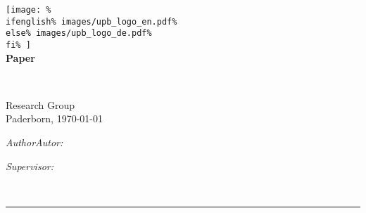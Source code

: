 \begin{center}
    \texttt{[image: \%
        \\ifenglish\%
        images/upb\_logo\_en.pdf\%
        \\else\%
        images/upb\_logo\_de.pdf\%
        \\fi\%
    ]}\\[0.4cm]
    
    
    \textbf{\Large \type{} Paper}\\[0.5cm]
    \begin{minipage}{\textwidth}
        \centering\huge\bfseries \makeatletter\textsf{\@title}\makeatother
    \end{minipage}\\[0.5cm]



    {Research Group \ResearchGroup}\\
    {Paderborn, \today}\\[0.5cm]

    \begin{minipage}{0.45\textwidth}
        \emph{\ifenglish{}Author\else Autor\fi:} \\ \makeatletter\@author\makeatother%
    \end{minipage}
    \hfill
    \begin{minipage}{0.45\textwidth}
        \begin{flushright}
            \emph{Supervisor:} \\ \Supervisor%
        \end{flushright}
    \end{minipage}\\[0.4cm]
    \rule{12cm}{0.4pt}
\end{center}
